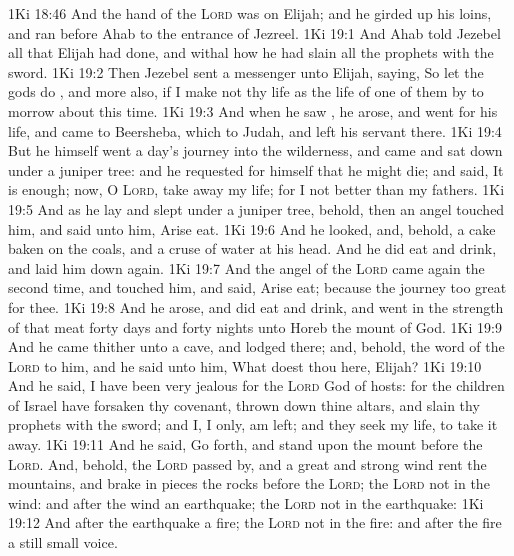 \vs 1Ki 18:46 And the hand of the \textsc{Lord} was on Elijah; and he girded up his loins, and ran before Ahab to the entrance of Jezreel.
\vs 1Ki 19:1 And Ahab told Jezebel all that Elijah had done, and withal how he had slain all the prophets with the sword.
\vs 1Ki 19:2 Then Jezebel sent a messenger unto Elijah, saying, So let the gods do , and more also, if I make not thy life as the life of one of them by to morrow about this time.
\vs 1Ki 19:3 And when he saw , he arose, and went for his life, and came to Beersheba, which  to Judah, and left his servant there.
\vs 1Ki 19:4 But he himself went a day's journey into the wilderness, and came and sat down under a juniper tree: and he requested for himself that he might die; and said, It is enough; now, O \textsc{Lord}, take away my life; for I  not better than my fathers.
\vs 1Ki 19:5 And as he lay and slept under a juniper tree, behold, then an angel touched him, and said unto him, Arise  eat.
\vs 1Ki 19:6 And he looked, and, behold,  a cake baken on the coals, and a cruse of water at his head. And he did eat and drink, and laid him down again.
\vs 1Ki 19:7 And the angel of the \textsc{Lord} came again the second time, and touched him, and said, Arise  eat; because the journey  too great for thee.
\vs 1Ki 19:8 And he arose, and did eat and drink, and went in the strength of that meat forty days and forty nights unto Horeb the mount of God.
\vs 1Ki 19:9 And he came thither unto a cave, and lodged there; and, behold, the word of the \textsc{Lord}  to him, and he said unto him, What doest thou here, Elijah?
\vs 1Ki 19:10 And he said, I have been very jealous for the \textsc{Lord} God of hosts: for the children of Israel have forsaken thy covenant, thrown down thine altars, and slain thy prophets with the sword; and I,  I only, am left; and they seek my life, to take it away.
\vs 1Ki 19:11 And he said, Go forth, and stand upon the mount before the \textsc{Lord}. And, behold, the \textsc{Lord} passed by, and a great and strong wind rent the mountains, and brake in pieces the rocks before the \textsc{Lord};  the \textsc{Lord}  not in the wind: and after the wind an earthquake;  the \textsc{Lord}  not in the earthquake:
\vs 1Ki 19:12 And after the earthquake a fire;  the \textsc{Lord}  not in the fire: and after the fire a still small voice.
